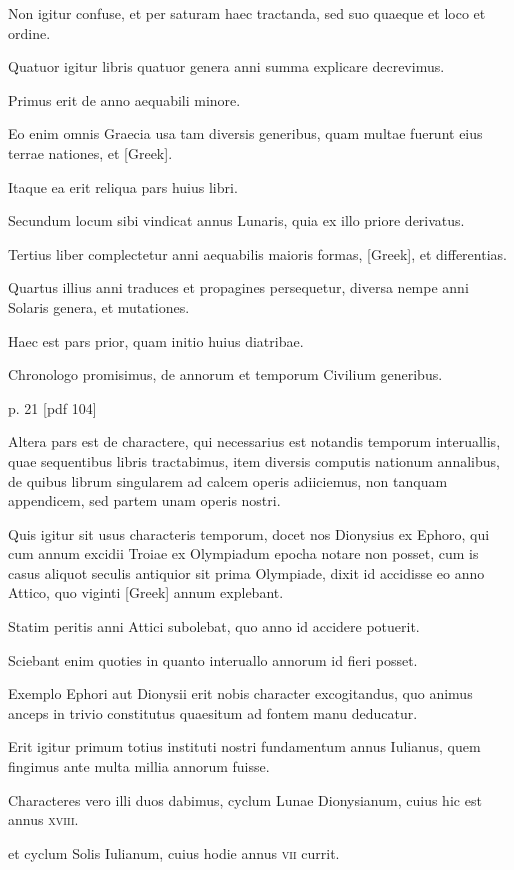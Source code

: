 Non igitur confuse, et per saturam haec
tractanda, sed suo quaeque et loco et ordine.

Quatuor igitur libris
quatuor genera anni summa explicare decrevimus.

Primus erit de
anno aequabili minore.

Eo enim omnis Graecia usa tam diversis generibus,
quam multae fuerunt eius terrae nationes, et \textgreek{[Greek]}.

Itaque
ea erit reliqua pars huius libri.

Secundum locum sibi vindicat annus
Lunaris, quia ex illo priore derivatus.

Tertius liber complectetur anni
aequabilis maioris formas, \textgreek{[Greek]}, et differentias.

Quartus illius anni
traduces et propagines persequetur, diversa nempe anni Solaris genera,
et mutationes.

Haec est pars prior, quam initio huius diatribae.

Chronologo promisimus, de annorum et temporum Civilium generibus.


p. 21 [pdf 104]

Altera pars est de charactere, qui necessarius est notandis temporum
interuallis, quae sequentibus libris tractabimus, item diversis
computis nationum annalibus, de quibus librum singularem ad calcem
operis adiiciemus, non tanquam appendicem, sed partem unam
operis nostri.

Quis igitur sit usus characteris temporum, docet nos
Dionysius ex Ephoro, qui cum annum excidii Troiae ex Olympiadum
epocha notare non posset, cum is casus aliquot seculis antiquior
sit prima Olympiade, dixit id accidisse eo anno Attico, quo viginti
\textgreek{[Greek]} annum explebant.

Statim peritis anni Attici subolebat,
quo anno id accidere potuerit.

Sciebant enim quoties in quanto
interuallo annorum id fieri posset.

Exemplo Ephori aut Dionysii
erit nobis character excogitandus, quo animus anceps in trivio constitutus
quaesitum ad fontem manu deducatur.

Erit igitur primum
totius instituti nostri fundamentum annus Iulianus, quem fingimus
ante multa millia annorum fuisse.

Characteres vero illi duos dabimus,
cyclum Lunae Dionysianum, cuius hic est annus \textsc{xviii}.

et cyclum
Solis Iulianum, cuius hodie annus \textsc{vii} currit.


